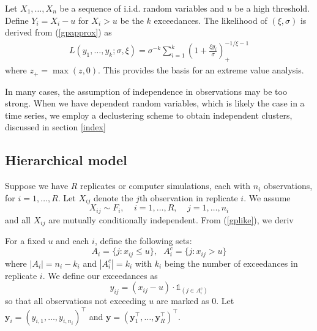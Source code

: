 \documentclass[12pt]{article}
\newcommand{\m}[1]{\mathbf{\bm{#1}}}
\newcommand{\ind}{\mathds{1}}
\newcommand{\m}[1]{\mathbf{\bm{#1}}}
\begin{document}
Let $X_1,\ldots,X_n$ be a sequence of i.i.d. random variables and $u$ be a high threshold. Define $Y_i=X_i-u$ for $X_i>u$ be the $k$ exceedances. The likelihood of $(\xi,\sigma)$ is derived from (\ref{gpapprox}) as
\begin{align}
L(y_1,\ldots,y_k;\sigma,\xi)=\sigma^{-k}\sum_{i=1}^k\left(1+\frac{\xi y_i}{\sigma}\right)_+^{-1/\xi-1} \label{gplike}
\end{align}
where $z_+=\max(z,0)$. This provides the basis for an extreme value analysis.

In many cases, the assumption of independence in observations may be too strong. When we have dependent random variables, which is likely the case in a time series, we employ a declustering scheme to obtain independent clusters, discussed in section \ref{index}
\bigskip


\subsection{Hierarchical model}
\label{hier}

Suppose we have $R$ replicates or computer simulations, each with $n_i$ observations, for $i=1,\ldots,R$. Let $X_{ij}$ denote the $j$th observation in replicate $i$. We assume
\[ X_{ij} \sim F_i,~~~~~i=1,\ldots,R,~~~~~j=1,\ldots,n_i \]
and all $X_{ij}$ are mutually conditionally independent. From (\ref{gplike}), we deriv

For a fixed $u$ and each $i$, define the following sets:
\[ A_i = \{j:x_{ij}\leq u\},~~~ A_i^c = \{j: x_{ij}>u\} \]
where $|A_i|=n_i-k_i$ and $|A_i^c|=k_i$ with $k_i$ being the number of exceedances in replicate $i$. We define our exceedances as
\[ y_{ij} = (x_{ij}-u)\cdot \ind_{(j \in A_i^c)} \]
so that all observations not exceeding $u$ are marked as $0$. Let $\m{y}_i=(y_{i,1},\ldots,y_{i,n_i})^\top$ and $\m{y}=(\m{y}_1^\top,\ldots,\m{y}_R^\top)^\top$.
\bigskip
\end{document}
